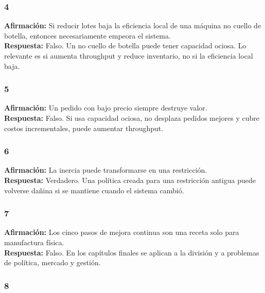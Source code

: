 \documentclass[
  11pt,
]{article}
\begin{document}
\hypertarget{section-3}{%
\subsubsection{4}\label{section-3}}

\textbf{Afirmación:} Si reducir lotes baja la eficiencia local de una
máquina no cuello de botella, entonces necesariamente empeora el
sistema.\\
\textbf{Respuesta:} Falso. Un no cuello de botella puede tener capacidad
ociosa. Lo relevante es si aumenta throughput y reduce inventario, no si
la eficiencia local baja.

\hypertarget{section-4}{%
\subsubsection{5}\label{section-4}}

\textbf{Afirmación:} Un pedido con bajo precio siempre destruye valor.\\
\textbf{Respuesta:} Falso. Si usa capacidad ociosa, no desplaza pedidos
mejores y cubre costos incrementales, puede aumentar throughput.

\hypertarget{section-5}{%
\subsubsection{6}\label{section-5}}

\textbf{Afirmación:} La inercia puede transformarse en una
restricción.\\
\textbf{Respuesta:} Verdadero. Una política creada para una restricción
antigua puede volverse dañina si se mantiene cuando el sistema cambió.

\hypertarget{section-6}{%
\subsubsection{7}\label{section-6}}

\textbf{Afirmación:} Los cinco pasos de mejora continua son una receta
solo para manufactura física.\\
\textbf{Respuesta:} Falso. En los capítulos finales se aplican a la
división y a problemas de política, mercado y gestión.

\hypertarget{section-7}{%
\subsubsection{8}\label{section-7}}
\end{document}
